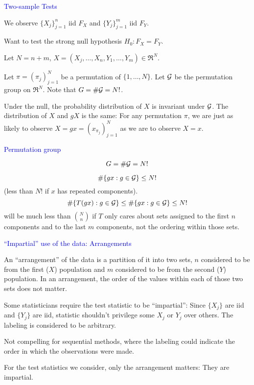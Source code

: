 \documentclass[landscape]{slides}
\newcommand{\cG}{{\cal G}}
\newcommand{\beq}{\begin{equation}}
\newcommand{\eeq}{\end{equation}}
\begin{document}
\begin{slide}
{\textcolor{blue}{Two-sample Tests}}

We observe $\{ X_j \}_{j=1}^n$ iid $F_X$ and
$\{ Y_j \}_{j=1}^m$ iid $F_Y$.

Want to test the strong null hypothesis $H_0: F_X = F_Y$.

Let $N = n+m$, $X = (X_j, \ldots , X_n, Y_1, \ldots, Y_m) \in \Re^N$.

Let $\pi = (\pi_j)_{j=1}^N$ be a permutation of $\{1, \ldots, N\}$.
Let $\cG$ be the permutation group on $\Re^N$.
Note that $G = \# \cG = N!$.

Under the null, the probability distribution of $X$ is invariant under $\cG$.
The distribution of $X$ and $gX$ is the same: For any permutation
$\pi$, we are just as likely to
observe $X = gx = (x_{\pi_j})_{j=1}^N$ as we are to observe $X = x$.

\end{slide}

\begin{slide}
{\textcolor{blue}{Permutation group}}

\beq
   G = \# \cG = N!
\eeq

\beq
   \# \{ gx : g \in \cG\} \le N!
\eeq
(less than $N!$ if $x$ has repeated components).
\beq
   \# \{ T(gx) : g \in \cG\} \le \# \{ gx : g \in \cG\} \le N!
\eeq
will be much less than ${{N}\choose{n}}$ if $T$ only cares about 
sets assigned to the first $n$ components and to the last $m$ components,
not the ordering within those sets.

\end{slide}

\begin{slide}
{\textcolor{blue}{``Impartial'' use of the data: Arrangements}}

An ``arrangement'' of the data is a partition of it into two sets, $n$ considered to
be from the first ($X$) population and $m$ considered to be from the second ($Y$)
population.
In an arrangement, the order of the values within each of those two sets does not matter.

Some statisticians require the test statistic to be ``impartial'': Since $\{X_j\}$ are iid
and $\{Y_j\}$ are iid, statistic shouldn't privilege some $X_j$ or $Y_j$ over others.
The labeling is considered to be arbitrary.

Not compelling for sequential methods, where the labeling could indicate the order in
which the observations were made.

For the test statistics we consider, only the arrangement matters: They are impartial.

\end{slide}
\end{document}
